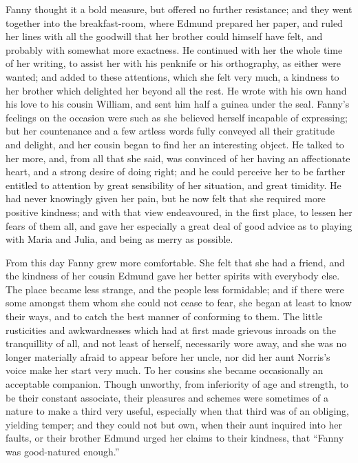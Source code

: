 Fanny thought it a bold measure, but offered no further
resistance; and they went together into the breakfast-room,
where Edmund prepared her paper, and ruled her lines
with all the goodwill that her brother could himself
have felt, and probably with somewhat more exactness.
He continued with her the whole time of her writing,
to assist her with his penknife or his orthography,
as either were wanted; and added to these attentions,
which she felt very much, a kindness to her brother which
delighted her beyond all the rest.  He wrote with his own
hand his love to his cousin William, and sent him half
a guinea under the seal.  Fanny's feelings on the occasion
were such as she believed herself incapable of expressing;
but her countenance and a few artless words fully
conveyed all their gratitude and delight, and her cousin
began to find her an interesting object.  He talked
to her more, and, from all that she said, was convinced
of her having an affectionate heart, and a strong desire
of doing right; and he could perceive her to be farther
entitled to attention by great sensibility of her situation,
and great timidity.  He had never knowingly given her pain,
but he now felt that she required more positive kindness;
and with that view endeavoured, in the first place,
to lessen her fears of them all, and gave her especially
a great deal of good advice as to playing with Maria
and Julia, and being as merry as possible.

From this day Fanny grew more comfortable.  She felt
that she had a friend, and the kindness of her cousin
Edmund gave her better spirits with everybody else.
The place became less strange, and the people less formidable;
and if there were some amongst them whom she could not
cease to fear, she began at least to know their ways,
and to catch the best manner of conforming to them.
The little rusticities and awkwardnesses which had at
first made grievous inroads on the tranquillity of all,
and not least of herself, necessarily wore away, and she
was no longer materially afraid to appear before her uncle,
nor did her aunt Norris's voice make her start very much.
To her cousins she became occasionally an acceptable companion.
Though unworthy, from inferiority of age and strength,
to be their constant associate, their pleasures and schemes
were sometimes of a nature to make a third very useful,
especially when that third was of an obliging,
yielding temper; and they could not but own, when their
aunt inquired into her faults, or their brother Edmund
urged her claims to their kindness, that ``Fanny was
good-natured enough.''

